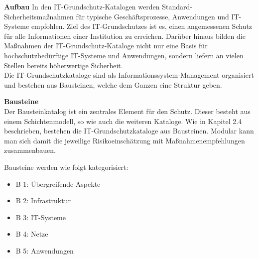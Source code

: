  \label{Aufbau Grundschutzkataloge}
 \textbf{Aufbau}
	In den IT-Grundschutz-Katalogen werden Standard-Sicherheitsmaßnahmen für typische Geschäftsprozesse, 
	Anwendungen und IT-Systeme empfohlen. Ziel des IT-Grundschutzes ist es, 
	einen angemessenen Schutz für alle Informationen einer Institution zu erreichen. 
	Darüber hinaus bilden die Maßnahmen der IT-Grundschutz-Kataloge nicht nur 
	eine Basis für hochschutzbedürftige IT-Systeme und Anwendungen, 
	sondern liefern an vielen Stellen bereits höherwertige Sicherheit. \\
	Die IT-Grundschutzkataloge sind als Informationssystem-Management organisiert und 
	bestehen aus Bausteinen, welche dem Ganzen eine Struktur geben.
 \pagebreak 
 
 \label{Bausteine}
 \textbf{Bausteine} \\
 	Der Bausteinkatalog ist ein zentrales Element für den Schutz.
 	Dieser besteht aus einem Schichtenmodell, so wie auch die weiteren Kataloge.
 	Wie in Kapitel 2.4 beschrieben, bestehen die IT-Grundschutzkataloge aus Bausteinen.
 	Modular kann man sich damit die jeweilige Risikoeinschätzung mit Maßnahmenempfehlungen zusammenbauen.
 	
 	Bausteine werden wie folgt kategorisiert: 	
 	\begin{itemize}
 		\item B 1: Übergreifende Aspekte
 		\item B 2: Infrastruktur
 		\item B 3: IT-Systeme
 		\item B 4: Netze
 		\item B 5: Anwendungen
 	\end{itemize} 
 	
